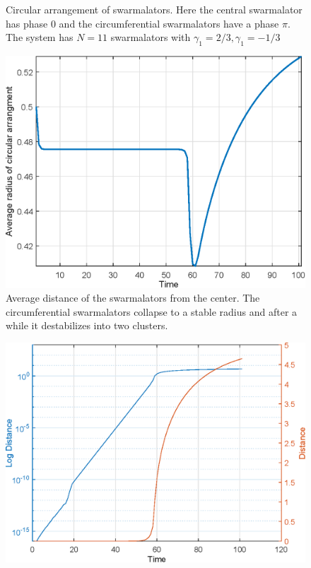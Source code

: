 \documentclass[superscriptaddress,reprint,amssymb, amsmath,aps, pre]{revtex4-1}
\begin{document}
{\begin{figure}
        \caption{Circular arrangement of swarmalators. Here the central swarmalator has phase \(0\) and the circumferential swarmalators have a phase \(\pi\). The system has \(N = 11\) swarmalators with \(\gamma_1 = 2/3,\gamma_1 = -1/3\)}
        \label{fig:circleArr}
    \end{figure}
    \begin{figure}
        \includegraphics[width=\linewidth]{radiiVtime.eps}
        \caption{Average distance of the swarmalators from the center. The circumferential swarmalators collapse to a stable radius and after a while it destabilizes into two clusters.}
        \label{fig:radVtime}
    \end{figure}
    \begin{figure}
        \includegraphics[width = \linewidth]{centerDistVtime.eps}

\end{figure}}
\end{document}
